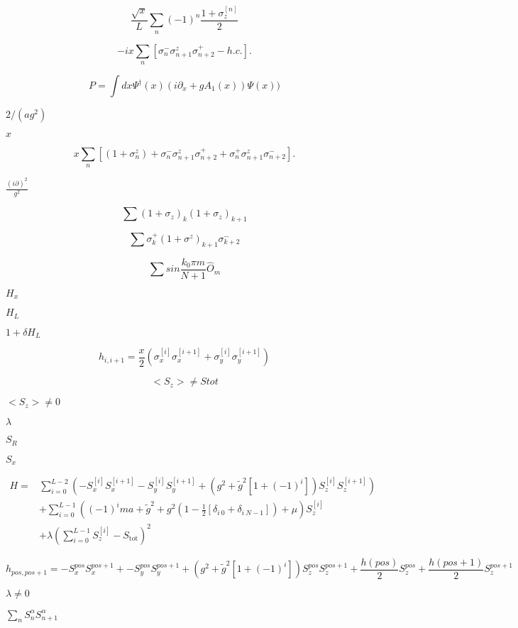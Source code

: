 \documentclass{article}
\begin{document}
\[ \frac{\sqrt{x}}{L}\sum_n (-1)^n \frac{1+\sigma_z^{[n]}}{2} \]
\pagebreak

\[-i x \sum_n [\sigma_n^- \sigma_{n+1}^z \sigma_{n+2}^+ - h.c.].\]
\pagebreak

\[P=\int dx \Psi^{\dagger}(x)(i \partial_x+g A_1(x))\Psi(x))\]
\pagebreak

$2/(a g^2)$
\pagebreak

$x$
\pagebreak

\[x \sum_n [(1+\sigma_n^z) +\sigma_{n}^-\sigma_{n+1}^z \sigma_{n+2}^+ + \sigma_{n}^+\sigma_{n+1}^z \sigma_{n+2}^- ].\]
\pagebreak

$\frac{(i\partial)^2}{g^2}$
\pagebreak

\[\sum (1+\sigma_z)_k (1+\sigma_z)_{k+1}\]
\pagebreak

\[\sum \sigma^+_k (1+\sigma^z)_{k+1} \sigma^-_{k+2} \]
\pagebreak

\[\sum sin\frac{k_0 \pi m}{N+1} \hat{O}_m \]
\pagebreak

$H_x$
\pagebreak

$H_L$
\pagebreak

$1+\delta H_L$
\pagebreak

\[ h_{i,i+1}= \frac{x}{2} (\sigma_{x}^{[i]} \sigma_{x}^{[i+1]} + \sigma_{y}^{[i]} \sigma_{y}^{[i+1]} )\]
\pagebreak

\[<S_z>\neq Stot\]
\pagebreak

$<S_z>\neq 0$
\pagebreak

$\lambda$
\pagebreak

$S_R$
\pagebreak

$S_x$
\pagebreak

\begin{eqnarray*} H=&\sum_{i=0}^{L-2} \left ( -S_x^{[i]}S_x^{[i+1]}-S_y^{[i]}S_y^{[i+1]} + \left(g^2+\tilde{g}^2[1+(-1)^i]\right) S_z^{[i]}S_z^{[i+1]} \right)\\ &+ \sum_{i=0}^{L-1} \left( (-1)^i ma +\tilde{g}^2 +g^2(1-\frac{1}{2}[\delta_{i\ 0}+\delta_{i\ N-1}])+\mu \right) S_z^{[i]}\\ &+\lambda \left ( \sum_{i=0}^{L-1} S_z^{[i]}-S_{\mathrm{tot}}\right)^2 \end{eqnarray*}
\pagebreak

\[ h_{pos,pos+1}=- S_x^{pos} S_x^{pos+1} + - S_y^{pos} S_y^{pos+1}+ \left(g^2+\tilde{g}^2[1+(-1)^i]\right) S_z^{pos} S_z^{pos+1}+ \frac{h({pos})}{2} S_z^{pos} + \frac{h({pos+1})}{2} S_z^{pos+1} \]
\pagebreak

$\lambda \neq 0$
\pagebreak

$\sum_n S_n^{\alpha}S_{n+1}^{\alpha}$
\pagebreak
\end{document}
